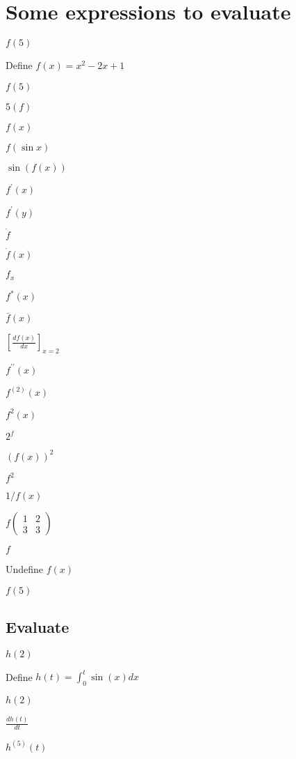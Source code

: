 \documentclass{article}
\begin{document}
\section{Some expressions to evaluate}

$f\left( 5\right) $

Define $f\left( x\right) =x^{2}-2x+1$

$f\left( 5\right) $

$5(f)$

$f(x)$

$f(\sin x)$

$\sin (f(x))$

$f^{\prime }\left( x\right) $

$f^{\prime }\left( y\right) $

$\dot{f}$

$\dot{f}\left( x\right) $

$f_{x}$

$f^{\ast }\left( x\right) $

$\bar{f}(x)$

$\left[ \frac{df\left( x\right) }{dx}\right] _{x=2}$

$f^{\prime \prime }\left( x\right) $

$f^{\left( 2\right) }\left( x\right) $

$f^{2}\left( x\right) $

$2^{f}$

$\left( f\left( x\right) \right) ^{2}$

$f^{2}$

$1/f\left( x\right) $

$f\left( 
\begin{array}{cc}
1 & 2 \\ 
3 & 3%
\end{array}%
\right) $

$f$

Undefine $f\left( x\right) $

$f\left( 5\right) $

\subsection{Evaluate}

$h\left( 2\right) $

Define $h\left( t\right) =\int_{0}^{t}\sin \left( x\right) dx$

$h\left( 2\right) $

$\frac{dh(t)}{dt}$

$h^{\left( 5\right) }\left( t\right) $
\end{document}
